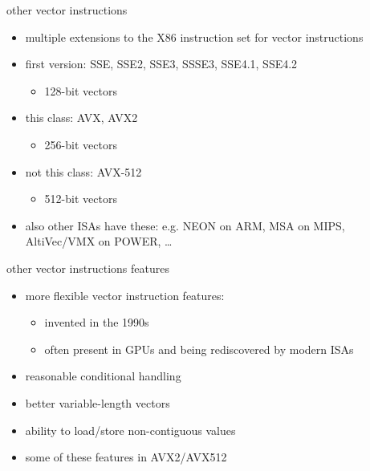 \begin{frame}{other vector instructions}
    \begin{itemize}
    \item multiple extensions to the X86 instruction set for vector instructions
    \item first version: SSE, SSE2, SSE3, SSSE3, SSE4.1, SSE4.2
        \begin{itemize}
        \item 128-bit vectors
        \end{itemize}
    \item this class: AVX, AVX2
        \begin{itemize}
        \item 256-bit vectors
        \end{itemize}
    \item not this class: AVX-512
        \begin{itemize}
        \item 512-bit vectors
        \end{itemize}
        \vspace{.5cm}
    \item also other ISAs have these: e.g. NEON on ARM, MSA on MIPS, AltiVec/VMX on POWER, \ldots
    \end{itemize}
\end{frame}

\begin{frame}{other vector instructions features}
    \begin{itemize}
    \item more flexible vector instruction features:
        \begin{itemize}
        \item invented in the 1990s
        \item often present in GPUs and being rediscovered by modern ISAs
        \end{itemize}
    \item reasonable conditional handling
    \item better variable-length vectors
    \item ability to load/store non-contiguous values
    \vspace{.5cm}
    \item some of these features in AVX2/AVX512
    \end{itemize}
\end{frame}
